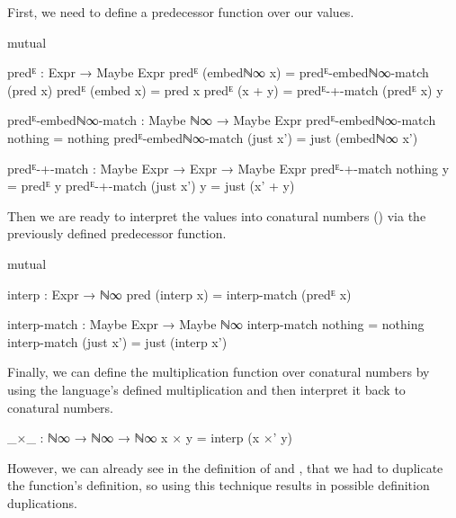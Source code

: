 First, we need to define a predecessor function over our  values.

\begin{code}[hide]
mutual
\end{code}
\begin{code}
  predᴱ : Expr → Maybe Expr
  predᴱ (embedℕ∞ x) = predᴱ-embedℕ∞-match (pred x)
  predᴱ (embed x) = pred x
  predᴱ (x + y) = predᴱ-+-match (predᴱ x) y

  predᴱ-embedℕ∞-match : Maybe ℕ∞ → Maybe Expr
  predᴱ-embedℕ∞-match nothing = nothing
  predᴱ-embedℕ∞-match (just x') = just (embedℕ∞ x')

  predᴱ-+-match : Maybe Expr → Expr → Maybe Expr
  predᴱ-+-match nothing y = predᴱ y
  predᴱ-+-match (just x') y = just (x' + y)
\end{code}

Then we are ready to interpret the  values into conatural numbers ()
via the previously defined predecessor function.

\begin{code}[hide]
mutual
\end{code}
\begin{code}
  interp : Expr → ℕ∞
  pred (interp x) = interp-match (predᴱ x)

  interp-match : Maybe Expr → Maybe ℕ∞
  interp-match nothing = nothing
  interp-match (just x') = just (interp x')
\end{code}

Finally, we can define the multiplication function over conatural numbers by using
the language's defined multiplication and then interpret it back to conatural numbers.

\begin{code}
_×_ : ℕ∞ → ℕ∞ → ℕ∞
x × y = interp (x ×' y)
\end{code}

However, we can already see in the definition of  and , that we had to
duplicate the \AgdaFunction{\_+\_} function's definition, so using this technique
results in possible definition duplications.

